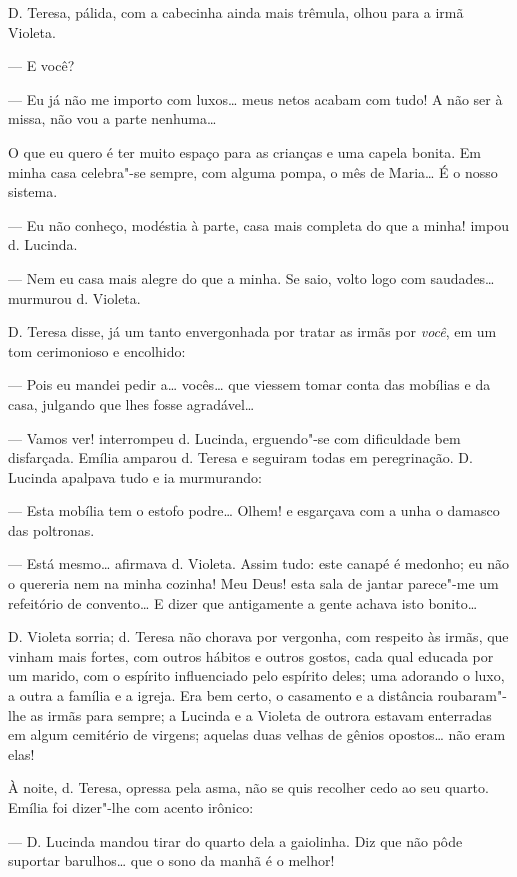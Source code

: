 D. Teresa, pálida, com a cabecinha ainda mais trêmula, olhou para a irmã
Violeta.

--- E você?

--- Eu já não me importo com luxos\ldots{} meus netos acabam com tudo! A não
ser à missa, não vou a parte nenhuma\ldots{}

O que eu quero é ter muito espaço para as crianças e uma capela bonita.
Em minha casa celebra"-se sempre, com alguma pompa, o mês de Maria\ldots{} É o
nosso sistema.

--- Eu não conheço, modéstia à parte, casa mais completa do que a minha!
impou d. Lucinda.

--- Nem eu casa mais alegre do que a minha. Se saio, volto logo com
saudades\ldots{} murmurou d. Violeta.

D. Teresa disse, já um tanto envergonhada por tratar as irmãs por
\emph{você}, em um tom cerimonioso e encolhido:

--- Pois eu mandei pedir a\ldots{} vocês\ldots{} que viessem tomar conta das
mobílias e da casa, julgando que lhes fosse agradável\ldots{}

--- Vamos ver! interrompeu d. Lucinda, erguendo"-se com dificuldade bem
disfarçada. Emília amparou d. Teresa e seguiram todas em peregrinação.
D. Lucinda apalpava tudo e ia murmurando:

--- Esta mobília tem o estofo podre\ldots{} Olhem! e esgarçava com a unha o
damasco das poltronas.

--- Está mesmo\ldots{} afirmava d. Violeta. Assim tudo: este canapé é
medonho; eu não o quereria nem na minha cozinha! Meu Deus! esta sala de
jantar parece"-me um refeitório de convento\ldots{} E dizer que antigamente a
gente achava isto bonito\ldots{}

D. Violeta sorria; d. Teresa não chorava por vergonha, com respeito às
irmãs, que vinham mais fortes, com outros hábitos e outros gostos, cada
qual educada por um marido, com o espírito influenciado pelo espírito
deles; uma adorando o luxo, a outra a família e a igreja. Era bem certo,
o casamento e a distância roubaram"-lhe as irmãs para sempre; a Lucinda e
a Violeta de outrora estavam enterradas em algum cemitério de virgens;
aquelas duas velhas de gênios opostos\ldots{} não eram elas!

À noite, d. Teresa, opressa pela asma, não se quis recolher cedo ao seu
quarto. Emília foi dizer"-lhe com acento irônico:

--- D. Lucinda mandou tirar do quarto dela a gaiolinha. Diz que não pôde
suportar barulhos\ldots{} que o sono da manhã é o melhor!


